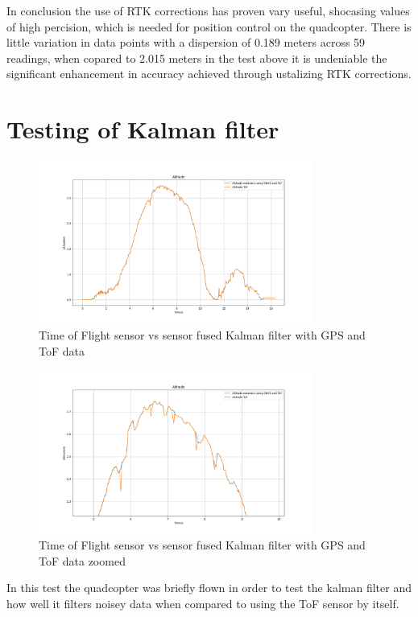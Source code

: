 \documentclass{report}
\begin{document}
In conclusion the use of RTK corrections has proven vary useful, shocasing
values of high percision, which is needed for position control on the
quadcopter. There is little variation in data points with a dispersion of 0.189
meters across 59 readings, when copared to 2.015 meters in the test above it is
undeniable the significant enhancement in accuracy achieved through ustalizing
RTK corrections. 

\section{Testing of Kalman filter}
\begin{figure}[H]
  \centering
  \includegraphics[width=0.8\textwidth]{Pictures/Altitude_with_GNSS.png}
  \caption{Time of Flight sensor vs sensor fused Kalman filter with GPS and ToF data}
  \label{fig:Kalman_filter_test}
\end{figure}

\begin{figure}[H]
  \centering
  \includegraphics[width=0.8\textwidth]{Pictures/Altitude_with_GNSS_zoomed.png}
  \caption{Time of Flight sensor vs sensor fused Kalman filter with GPS and ToF data zoomed}
  \label{fig:Kalman_filter_test_zoomed}
\end{figure}
In this test the quadcopter was briefly flown in order to test the kalman filter and how well it filters noisey data when compared to using the ToF sensor by itself.
\end{document}
